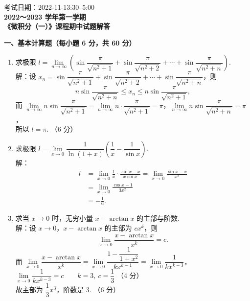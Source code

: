 \documentclass[a4paper,11pt]{ctexart}
\newcommand{\score}[1]{\hfill（#1）}
\begin{document}
\begin{center}
  {\small 考试日期：2022-11-13:30--5:00}\\[0.6em]
  {\Large\bfseries 2022～2023 学年第一学期}\\[0.4em]
  {\Large\bfseries 《微积分（一）》课程期中试题解答}
\end{center}

\vspace{0.6em}

\textbf{一、基本计算题（每小题 6 分，共 60 分）}

\begin{enumerate}[label=\arabic*., leftmargin=2em, itemsep=1.0em, topsep=0.5em]
  \item 求极限 $l = \lim\limits_{n\to\infty}\left(\sin\dfrac{\pi}{\sqrt{n^2+1}} + \sin\dfrac{\pi}{\sqrt{n^2+2}} + \cdots + \sin\dfrac{\pi}{\sqrt{n^2+n}}\right)$.\\[0.3em]
  解：设 $x_n = \sin\dfrac{\pi}{\sqrt{n^2+1}} + \sin\dfrac{\pi}{\sqrt{n^2+2}} + \cdots + \sin\dfrac{\pi}{\sqrt{n^2+n}}$，则
  \[
    n\sin\frac{\pi}{\sqrt{n^2+n}} \le x_n \le n\sin\frac{\pi}{\sqrt{n^2+1}}, \tag*{（3 分）}
  \]
  而 $\lim\limits_{n\to\infty} n\sin\dfrac{\pi}{\sqrt{n^2+1}} = \lim\limits_{n\to\infty} n\cdot\dfrac{\pi}{\sqrt{n^2+1}} = \pi$，$\lim\limits_{n\to\infty} n\sin\dfrac{\pi}{\sqrt{n^2+n}} = \pi$，\\[0.2em]
  所以 $l = \pi$. \score{6 分}

  \item 求极限 $l = \lim\limits_{x\to 0}\dfrac{1}{\ln(1+x)}\left(\dfrac{1}{x} - \dfrac{1}{\sin x}\right)$.\\[0.3em]
  解：
  \vspace{-1.8em}
  \begin{align*}
    l &= \lim_{x\to 0}\frac{1}{x}\cdot\frac{\sin x - x}{x\sin x} = \lim_{x\to 0}\frac{\sin x - x}{x^3} \tag*{（3 分）} \\
      &= \lim_{x\to 0}\frac{\cos x - 1}{3x^2} \tag*{（5 分）} \\
      &= -\frac{1}{6}. \tag*{（6 分）}
  \end{align*}

  \item 求当 $x\to 0$ 时，无穷小量 $x - \arctan x$ 的主部与阶数.\\[0.3em]
  解：设 $x\to 0$，$x - \arctan x$ 的主部为 $cx^k$，则
  \[
    \lim_{x\to 0}\frac{x - \arctan x}{x^k} = c. \tag*{（2 分）}
  \]
  而 $\lim\limits_{x\to 0}\dfrac{x - \arctan x}{x^k} = \lim\limits_{x\to 0}\dfrac{1 - \dfrac{1}{1+x^2}}{kx^{k-1}} = \lim\limits_{x\to 0}\dfrac{1}{kx^{k-3}}$，\\[0.3em]
  $\lim\limits_{x\to 0}\dfrac{1}{kx^{k-3}} = c \qquad k = 3,\ c = \dfrac{1}{3}$ \score{4 分}\\[0.2em]
  故主部为 $\dfrac{1}{3}x^3$，阶数是 $3$. \score{6 分}


\end{enumerate}
\end{document}
